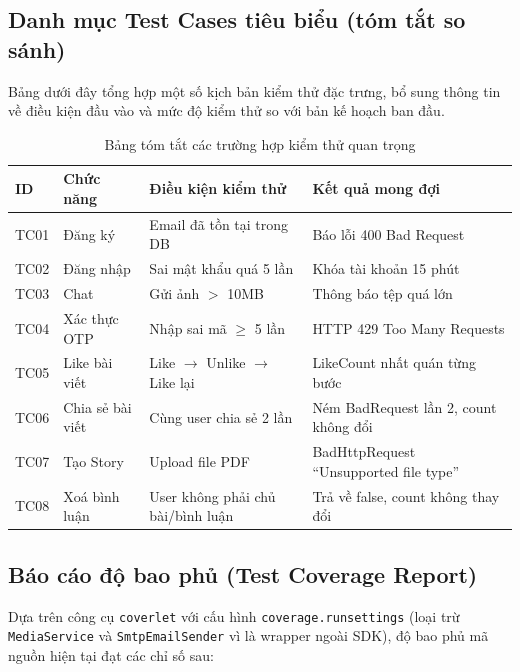 \documentclass[a4paper]{article}
\begin{document}
\subsection{Danh mục Test Cases tiêu biểu (tóm tắt so sánh)}

Bảng dưới đây tổng hợp một số kịch bản kiểm thử đặc trưng, bổ sung thông tin về điều kiện
đầu vào và mức độ kiểm thử so với bản kế hoạch ban đầu.

\begin{table}[H]
\centering
\begin{tabular}{|l|l|l|l|}
\hline
\textbf{ID} & \textbf{Chức năng} & \textbf{Điều kiện kiểm thử} & \textbf{Kết quả mong đợi} \\ \hline
TC01 & Đăng ký & Email đã tồn tại trong DB & Báo lỗi 400 Bad Request \\ \hline
TC02 & Đăng nhập & Sai mật khẩu quá 5 lần & Khóa tài khoản 15 phút \\ \hline
TC03 & Chat & Gửi ảnh $>$ 10MB & Thông báo tệp quá lớn \\ \hline
TC04 & Xác thực OTP & Nhập sai mã $\geq$ 5 lần & HTTP 429 Too Many Requests \\ \hline
TC05 & Like bài viết & Like $\to$ Unlike $\to$ Like lại & LikeCount nhất quán từng bước \\ \hline
TC06 & Chia sẻ bài viết & Cùng user chia sẻ 2 lần & Ném BadRequest lần 2, count không đổi \\ \hline
TC07 & Tạo Story & Upload file PDF & BadHttpRequest ``Unsupported file type'' \\ \hline
TC08 & Xoá bình luận & User không phải chủ bài/bình luận & Trả về false, count không thay đổi \\ \hline
\end{tabular}
\caption{Bảng tóm tắt các trường hợp kiểm thử quan trọng}
\end{table}

\subsection{Báo cáo độ bao phủ (Test Coverage Report)}

Dựa trên công cụ \texttt{coverlet} với cấu hình \texttt{coverage.runsettings}
(loại trừ \texttt{MediaService} và \texttt{SmtpEmailSender} vì là wrapper ngoài SDK),
độ bao phủ mã nguồn hiện tại đạt các chỉ số sau:
\end{document}
